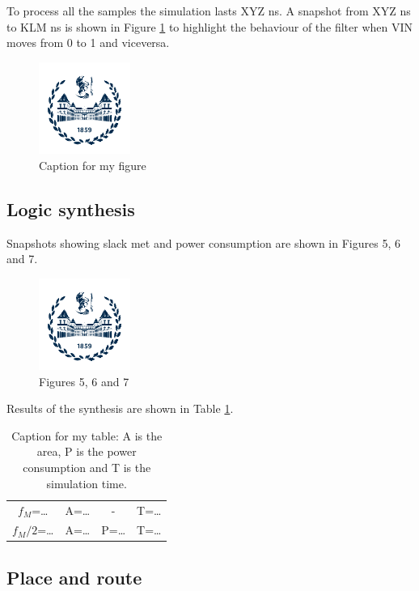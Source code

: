 To process all the samples the simulation lasts XYZ ns. A snapshot from XYZ ns to KLM ns is shown in Figure \ref{fig:lab1:fig4} to highlight the behaviour of the filter when VIN moves from 0 to 1 and viceversa.

\begin{figure}[h]
  \centering
  \includegraphics[width=3cm]{./logopoli_new}
  \caption{Caption for my figure}
  \label{fig:lab1:fig4}
\end{figure}

\subsection{Logic synthesis}

Snapshots showing slack met and power consumption are shown in Figures 5, 6 and 7.

\begin{figure}[h]
  \centering
  \includegraphics[width=3cm]{./logopoli_new}
  \caption{Figures 5, 6 and 7}
\end{figure}

Results of the synthesis are shown in Table \ref{tab:cap1:tab2}.

\begin{table}
  \centering
  \caption{Caption for my table: A is the area, P is the power consumption and T is the simulation time.}
  \label{tab:cap1:tab2}
  \begin{tabular}{c|c|c|c}
    $f_M$=\dots   & A=\dots & -       & T=\dots \\
    $f_M/2$=\dots & A=\dots & P=\dots & T=\dots \\
  \end{tabular}
\end{table}

\subsection{Place and route}


